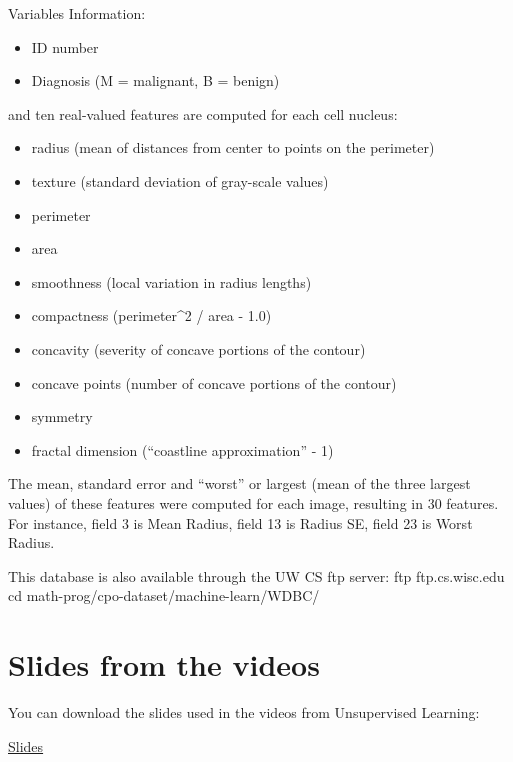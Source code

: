 \documentclass[
]{book}
\providecommand{\tightlist}{%
  \setlength{\itemsep}{0pt}\setlength{\parskip}{0pt}}
\begin{document}
Variables Information:

\begin{itemize}
\tightlist
\item
  ID number
\item
  Diagnosis (M = malignant, B = benign)
\end{itemize}

and ten real-valued features are computed for each cell nucleus:

\begin{itemize}
\tightlist
\item
  radius (mean of distances from center to points on the perimeter)
\item
  texture (standard deviation of gray-scale values)
\item
  perimeter
\item
  area
\item
  smoothness (local variation in radius lengths)
\item
  compactness (perimeter\^{}2 / area - 1.0)
\item
  concavity (severity of concave portions of the contour)
\item
  concave points (number of concave portions of the contour)
\item
  symmetry
\item
  fractal dimension (``coastline approximation'' - 1)
\end{itemize}

The mean, standard error and ``worst'' or largest (mean of the three
largest values) of these features were computed for each image,
resulting in 30 features. For instance, field 3 is Mean Radius, field
13 is Radius SE, field 23 is Worst Radius.

This database is also available through the UW CS ftp server:
ftp ftp.cs.wisc.edu
cd math-prog/cpo-dataset/machine-learn/WDBC/

\section*{Slides from the videos}\label{slides-from-the-videos}

You can download the slides used in the videos from Unsupervised Learning:

\href{https://www.dropbox.com/scl/fi/ag3ubg9bmgn7thg58fsmb/Module-7-Unsupervised-Learning_2025.pdf?rlkey=s8ar3xlql1rmsmdvggdirnzkd&st=zgk187fy&dl=1}{Slides}
\end{document}
